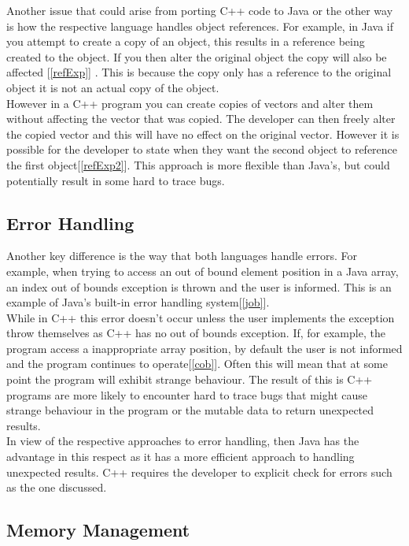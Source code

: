 \documentclass[10pt]{article}  %
\theoremstyle{definition}
\theoremstyle{remark}
\begin{document}
Another issue that could arise from porting C++ code to Java or the other way is how the respective language handles object references. For example, in Java if you attempt to create a copy of an object, this results in a reference being created to the object. If you then alter the original object the copy will also be affected [\ref{refExp}] . This is because the copy only has a reference to the original object it is not an actual copy of the object.\\

However in a C++ program you can create copies of vectors and alter them without affecting
the vector that was copied. The developer can then freely alter the copied vector and this will have no effect on the original vector. However it is possible for the developer to state when they want the second object to reference the first object[\ref{refExp2}]. This approach is more flexible than Java's, but could potentially result in some hard to trace bugs.

\subsection{Error Handling}\label{ss:back}

Another key difference is the way that both languages handle errors. For example, when trying to access an out of bound element position in a Java array, an index out of bounds exception is thrown and the user is informed. This is an example of Java's built-in error handling system[\ref{job}].\\

While in C++ this error doesn't occur unless the user implements the exception throw themselves as C++ has no out of bounds exception. If, for example, the program access a inappropriate array position, by default the user is not informed and the program continues to operate[\ref{cob}]. Often this will mean that at some point the program will exhibit strange behaviour.  The result of this is C++ programs are more likely to encounter hard to trace bugs that might cause strange behaviour in the program or the mutable data to return unexpected results.\\

In view of the respective approaches to error handling, then Java has the advantage in this respect as it has a more efficient approach to handling unexpected results. C++ requires the developer to explicit check for errors such as the one discussed. 

\subsection{Memory Management}\label{ss:back}
\end{document}
